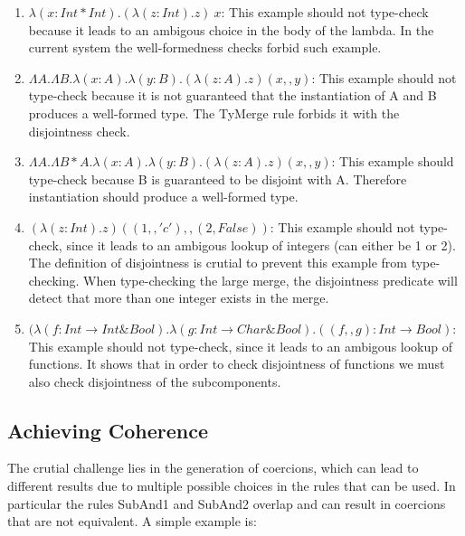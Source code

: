 \documentclass[preprint]{sigplanconf}
\begin{document}
\begin{enumerate}

\item $\lambda (x : Int * Int). (\lambda (z : Int) . z)~x$: This
  example should not type-check because it leads to an ambigous choice
  in the body of the lambda. In the current system the well-formedness
  checks forbid such example.

\item $\Lambda A.\Lambda B.\lambda (x:A).\lambda (y:B). (\lambda (z:A)
  . z) (x,,y)$: This example should not type-check because it is not
  guaranteed that the instantiation of A and B produces a well-formed
  type. The TyMerge rule forbids it with the disjointness check.

\item $\Lambda A.\Lambda B * A.\lambda (x:A).\lambda (y:B). (\lambda
  (z:A) . z) (x,,y)$: This example should type-check because B is
  guaranteed to be disjoint with A. Therefore instantiation should
  produce a well-formed type.

\item $(\lambda (z:Int) . z) ((1,,'c'),,(2,False))$: This example
  should not type-check, since it leads to an ambigous lookup of
  integers (can either be 1 or 2). The definition of disjointness is
  crutial to prevent this example from type-checking. When
  type-checking the large merge, the disjointness predicate will
  detect that more than one integer exists in the merge.

\item $(\lambda (f: Int \to Int \& Bool) . \lambda (g : Int \to Char \& Bool) . ((f,,g) : Int \to Bool)$: 
  This example
  should not type-check, since it leads to an ambigous lookup of
  functions. It shows that in order to check disjointness 
  of functions we must also check disjointness of the subcomponents. 

\end{enumerate}

\subsection{Achieving Coherence}

The crutial challenge lies in the generation of coercions, which can lead 
to different results due to multiple possible choices in the rules that 
can be used. In particular the rules SubAnd1 and SubAnd2 overlap and 
can result in coercions that are not equivalent. A simple example is:
\end{document}
